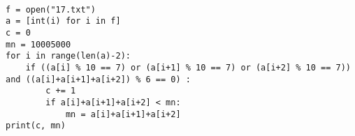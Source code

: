 \documentclass[14pt,a4paper]{article}
\begin{document}
\begin{verbatim}

f = open("17.txt")
a = [int(i) for i in f]
c = 0
mn = 10005000
for i in range(len(a)-2):
    if ((a[i] % 10 == 7) or (a[i+1] % 10 == 7) or (a[i+2] % 10 == 7)) and ((a[i]+a[i+1]+a[i+2]) % 6 == 0) :
        c += 1
        if a[i]+a[i+1]+a[i+2] < mn:
            mn = a[i]+a[i+1]+a[i+2]
print(c, mn)


\end{verbatim}
\end{document}
